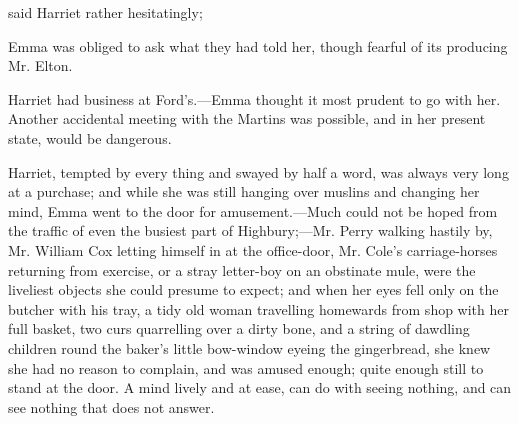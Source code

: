 
 said Harriet rather hesitatingly; 

Emma was obliged to ask what they had told her, though fearful of its producing Mr. Elton.









Harriet had business at Ford's.---Emma thought it most prudent to go with her. Another accidental meeting with the Martins was possible, and in her present state, would be dangerous.

Harriet, tempted by every thing and swayed by half a word, was always very long at a purchase; and while she was still hanging over muslins and changing her mind, Emma went to the door for amusement.---Much could not be hoped from the traffic of even the busiest part of Highbury;---Mr. Perry walking hastily by, Mr. William Cox letting himself in at the office-door, Mr. Cole's carriage-horses returning from exercise, or a stray letter-boy on an obstinate mule, were the liveliest objects she could presume to expect; and when her eyes fell only on the butcher with his tray, a tidy old woman travelling homewards from shop with her full basket, two curs quarrelling over a dirty bone, and a string of dawdling children round the baker's little bow-window eyeing the gingerbread, she knew she had no reason to complain, and was amused enough; quite enough still to stand at the door. A mind lively and at ease, can do with seeing nothing, and can see nothing that does not answer.

